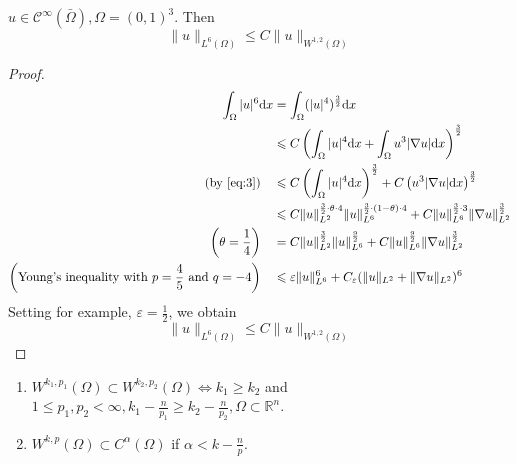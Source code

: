 \documentclass{report}
\begin{document}
\ex{}
{
    $u \in \mathcal{C}^{\infty}(\bar{\Omega}), \Omega = (0,1)^3$. Then 
    \begin{equation}
        \|u\|_{L^{6}(\Omega)} \leq C \|u\|_{W^{1, 2}(\Omega)}
    \end{equation}
}

\begin{proof}
    \begin{align*}
        \int_{\Omega} |u|^{6} \mathrm{d}x &= \int_{\Omega} (|u|^{4})^{\frac{3}{2}} \mathrm{d}x \\
        &\leq C \left(\int_{\Omega} |u|^{4} \mathrm{d}x + \int_{\Omega} u^{3}|\nabla u| \mathrm{d}x \right)^{\frac{3}{2}} \\
        (\text{by \eqref{eq:3}}) \quad &\leq C \left(\int_{\Omega} |u|^{4} \mathrm{d}x\right)^{\frac{3}{2}} + C \left(u^{3}|\nabla u| \mathrm{d}x \right)^{\frac{3}{2}} \\
        &\leq C \|u\|^{\frac{3}{2}\cdot \theta \cdot 4}_{L^{2}} \|u\|^{\frac{3}{2}\cdot (1-\theta) \cdot 4}_{L^{6}} + C \|u\|^{\frac{3}{2}\cdot 3}_{L^{6}} \|\nabla u\|^{\frac{3}{2}}_{L^{2}} \\
        \left(\theta = \frac{1}{4}\right) \quad &= C \|u\|^{\frac{3}{2}}_{L^{2}} \|u\|^{\frac{9}{2}}_{L^{6}} + C\|u\|^{\frac{9}{2}}_{L^{6}} \|\nabla u\|^{\frac{3}{2}}_{L^{2}} \\
        \left(\text{Young's inequality with } p=\frac{4}{5} \text{ and }q=-4\right) \quad &\leq \varepsilon \|u\|^{6}_{L^{6}} + C_{\varepsilon}(\|u\|_{L^{2}} + \|\nabla u\|_{L^{2}})^{6}
    \end{align*}
    Setting for example, $\varepsilon = \frac{1}{2}$, we obtain
    $$\|u\|_{L^{6}(\Omega)} \leq C \|u\|_{W^{1, 2}(\Omega)}$$
\end{proof}

{
    \begin{enumerate}[label=\bfseries\tiny\protect\circled{\small\arabic*}]
		\item $W^{k_1, p_1}(\Omega) \subset W^{k_2, p_2}(\Omega) \Longleftrightarrow k_1 \geq k_2$ and $1 \leq p_1, p_2 < \infty, k_1 - \frac{n}{p_1} \geq k_2 - \frac{n}{p_2}, \Omega \subset \mathbb{R}^{n}$.
		\item $W^{k,p}(\Omega) \subset C^{\alpha}(\Omega)$ if $\alpha < k - \frac{n}{p}$.
	\end{enumerate}
}
\end{document}
